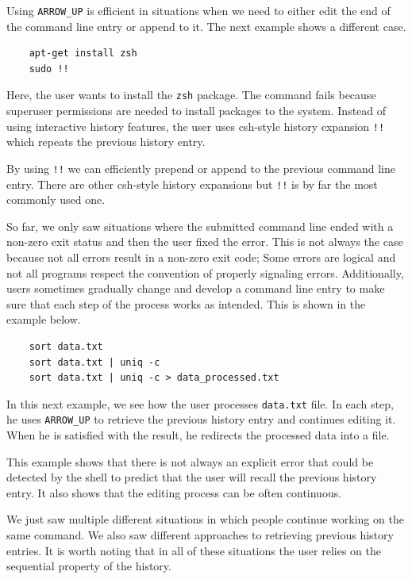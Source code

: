 \documentclass[thesis=M,english]{FITthesis}[2012/10/20]
\begin{document}
Using \verb|ARROW_UP| is efficient in situations when we need to either edit the end of the command line entry or append to it. %
The next example shows a different case.

\begin{verbatim}
    apt-get install zsh
    sudo !!
\end{verbatim}

Here, the user wants to install the \verb|zsh| package. The command fails because superuser permissions are needed to install packages to the system. Instead of using interactive history features, the user uses csh-style history expansion \verb|!!| which repeats the previous history entry. 

By using \verb|!!| we can efficiently prepend or append to the previous command line entry. There are other csh-style history expansions but \verb|!!| is by far the most commonly used one. 

So far, we only saw situations where the submitted command line ended with a non-zero exit status and then the user fixed the error. This is not always the case because not all errors result in a non-zero exit code; Some errors are logical and not all programs respect the convention of properly signaling errors. Additionally, users sometimes gradually change and develop a command line entry to make sure that each step of the process works as intended. This is shown in the example below.

\begin{verbatim}
    sort data.txt
    sort data.txt | uniq -c
    sort data.txt | uniq -c > data_processed.txt
\end{verbatim}

In this next example, we see how the user processes \verb|data.txt| file. In each step, he uses \verb|ARROW_UP| to retrieve the previous history entry and continues editing it. When he is satisfied with the result, he redirects the processed data into a file. 

This example shows that there is not always an explicit error that could be detected by the shell to predict that the user will recall the previous history entry. It also shows that the editing process can be often continuous.

We just saw multiple different situations in which people continue working on the same command. We also saw different approaches to retrieving previous history entries. It is worth noting that in all of these situations the user relies on the sequential property of the history. 
\end{document}
